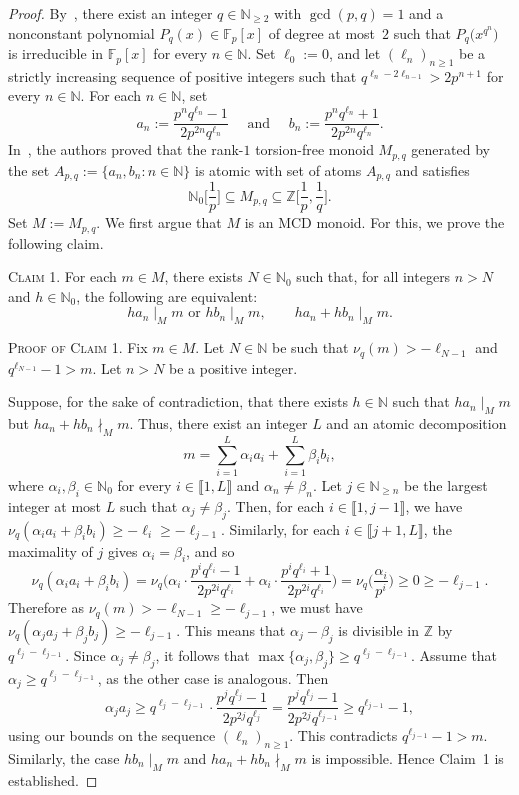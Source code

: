 \documentclass[10pt]{amsart}
\theoremstyle{definition}
\theoremstyle{remark}
\numberwithin{equation}{section}
\newcommand{\ff}{\mathbb{F}}
\newcommand{\nn}{\mathbb{N}}
\newcommand{\zz}{\mathbb{Z}}
\providecommand\ldb{\llbracket}
\providecommand\rdb{\rrbracket}
\begin{document}
\begin{proof}
  By~\cite[Theorem~5.6]{GGP25}, there exist an integer $q \in \nn_{\ge 2}$ with $\gcd(p,q)=1$ and a nonconstant polynomial $P_q(x) \in \ff_p[x]$ of degree at most~$2$ such that $P_q\big(x^{q^n}\big)$ is irreducible in $\ff_p[x]$ for every $n \in \nn$. Set $\ell_0:=0$, and let $(\ell_n)_{n \ge 1}$ be a strictly increasing sequence of positive integers such that $q^{\ell_n-2\ell_{n-1}} > 2p^{n+1}$ for every $n \in \nn$. For each $n \in \nn$, set
  \[
    a_n := \frac{p^n q^{\ell_n} - 1}{2p^{2n}q^{\ell_n}} \quad \text{ and } \quad  b_n := \frac{p^n q^{\ell_n} + 1}{2p^{2n}q^{\ell_n}}.
  \]
  In~\cite[Proposition~5.2]{GGP25}, the authors proved that the rank-$1$ torsion-free monoid $M_{p,q}$ generated by the set $A_{p,q}:=\{a_n,b_n : n \in \nn\}$ is atomic with set of atoms $A_{p,q}$ and satisfies
  \[
    \nn_0\bigg[\frac1p\bigg] \subseteq M_{p,q} \subseteq \zz\bigg[\frac1p, \frac1q\bigg].
  \]
  Set $M:=M_{p,q}$. We first argue that $M$ is an MCD monoid. For this, we prove the following claim.
  \smallskip

  \noindent \textsc{Claim 1.} For each $m \in M$, there exists $N \in \nn_0$ such that, for all integers $n>N$ and $h \in \nn_0$, the following are equivalent:
  \[
    ha_n \mid_M m \text{ or } hb_n \mid_M m, \qquad ha_n+hb_n \mid_M m.
  \]
  \smallskip

  \noindent \textsc{Proof of Claim 1.} Fix $m \in M$. Let $N \in \nn$ be such that $\nu_q(m)>-\ell_{N-1}$ and $q^{\ell_{N-1}}-1>m$. Let $n>N$ be a positive integer.

  Suppose, for the sake of contradiction, that there exists $h \in \nn$ such that $ha_n \mid_M m$ but $ha_n+hb_n \nmid_M m$. Thus, there exist an integer $L$ and an atomic decomposition
  \[
    m = \sum_{i=1}^L \alpha_i a_i + \sum_{i=1}^L \beta_i b_i,
  \]
  where $\alpha_i,\beta_i \in \nn_0$ for every $i \in \ldb 1,L \rdb$ and $\alpha_n \ne \beta_n$. Let $j \in \nn_{\ge n}$ be the largest integer at most $L$ such that $\alpha_j \ne \beta_j$. Then, for each $i \in \ldb 1,j-1 \rdb$, we have $\nu_q(\alpha_i a_i+\beta_i b_i) \ge -\ell_i \ge -\ell_{j-1}$. Similarly, for each $i \in \ldb j+1,L \rdb$, the maximality of $j$ gives $\alpha_i=\beta_i$, and so
  \[
    \nu_q(\alpha_i a_i+\beta_i b_i)=\nu_q\bigg(\alpha_i \cdot \frac{p^iq^{\ell_i}-1}{2p^{2i}q^{\ell_i}}+\alpha_i \cdot \frac{p^iq^{\ell_i}+1}{2p^{2i}q^{\ell_i}}\bigg)=\nu_q\bigg(\frac{\alpha_i}{p^i}\bigg) \ge 0 \ge -\ell_{j-1}.
  \]
  Therefore as $\nu_q(m)>-\ell_{N-1}\ge -\ell_{j-1}$, we must have $\nu_q(\alpha_j a_j+\beta_j b_j)\ge -\ell_{j-1}$. This means that $\alpha_j-\beta_j$ is divisible in $\zz$ by $q^{\ell_j-\ell_{j-1}}$. Since $\alpha_j \ne \beta_j$, it follows that $\max\{\alpha_j,\beta_j\}\ge q^{\ell_j-\ell_{j-1}}$. Assume that $\alpha_j\ge q^{\ell_j-\ell_{j-1}}$, as the other case is analogous. Then
  \[
    \alpha_j a_j \ge q^{\ell_j-\ell_{j-1}} \cdot \frac{p^jq^{\ell_j}-1}{2p^{2j}q^{\ell_j}} = \frac{p^jq^{\ell_j}-1}{2p^{2j}q^{\ell_{j-1}}} \ge q^{\ell_{j-1}}-1,
  \]
  using our bounds on the sequence $(\ell_n)_{n \ge 1}$. This contradicts $q^{\ell_{j-1}}-1>m$. Similarly, the case $hb_n \mid_M m$ and $ha_n+hb_n \nmid_M m$ is impossible. Hence Claim~1 is established.
  \smallskip


\end{proof}
\end{document}
